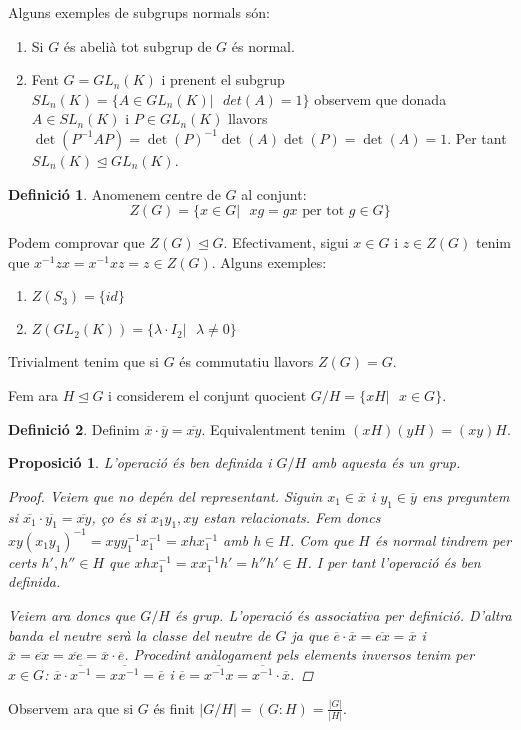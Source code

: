\documentclass[a4paper,11pt]{report}
\newcommand{\inv}[1]{#1^{-1}}
\renewcommand{\bar}{\overline}
\theoremstyle{theorem}
\newtheorem{proposicio}{\normalfont \sffamily\bfseries Proposició}[section]
\theoremstyle{definition}
\newtheorem{definicio}{\normalfont\sffamily\bfseries Definició}[section]
\begin{document}
Alguns exemples de subgrups normals són:
\begin{enumerate}
	\item Si $G$ és abelià tot subgrup de $G$ és normal.
	\item Fent $G=GL_n(K)$ i prenent el subgrup $SL_n(K)=\{A\in GL_n(K)|\text{ }det(A)=1\}$ observem que donada $A\in SL_n(K)$ i $P\in GL_n(K)$ llavors $\det(\inv{P}AP)=\inv{\det(P)}\det(A)\det(P)=\det(A)=1$. Per tant $SL_n(K)\unlhd GL_n(K)$.
\end{enumerate}
\begin{definicio}
Anomenem centre de $G$ al conjunt:
$$Z(G)=\{x\in G|\text{ } xg=gx \text{ per tot }g\in G\}$$
\end{definicio}
Podem comprovar que $Z(G)\unlhd G$. Efectivament, sigui $x\in G$ i $z\in Z(G)$ tenim que $\inv{x}zx=\inv{x}xz=z\in Z(G)$. Alguns exemples:
\begin{enumerate}
	\item $Z(S_3)=\{id\}$
	\item $Z(GL_2(K))=\{\lambda\cdot I_2|\text{ }\lambda\neq 0\}$
\end{enumerate}
Trivialment tenim que si $G$ és commutatiu llavors $Z(G)=G$.

Fem ara $H\unlhd G$ i considerem el conjunt quocient $G/H=\{xH|\text{ }x\in G\}$.
\begin{definicio}
Definim $\bar{x}\cdot\bar{y}=\bar{xy}$. Equivalentment tenim $(xH)(yH)=(xy)H$.
\end{definicio}
\begin{proposicio}
	L'operació és ben definida i $G/H$ amb aquesta és un grup.
	\begin{proof}
		Veiem que no depén del representant. Siguin $x_1\in \bar{x}$ i $y_1\in\bar{y}$ ens preguntem si $\bar{x_1}\cdot\bar{y_1}=\bar{xy}$, ço és si $x_1y_1,xy$ estan relacionats. Fem doncs $xy\inv{(x_1y_1)}=xy\inv{y_1}\inv{x_1}=xh\inv{x_1}$ amb $h\in H$. Com que $H$ és normal tindrem per certs $h',h''\in H$ que $xh\inv{x_1}=x\inv{x_1}h'=h''h'\in H$. I per tant l'operació és ben definida.
		
		Veiem ara doncs que $G/H$ és grup.
		L'operació és associativa per definició. D'altra banda el neutre serà la classe del neutre de $G$ ja que $\bar{e}\cdot\bar{x}=\bar{ex}=\bar{x}$ i $ \bar{x}=\bar{ex}=\bar{xe}=\bar{x}\cdot\bar{e}$. Procedint anàlogament pels elements inversos tenim per $x\in G$: $\bar{x}\cdot\bar{\inv{x}}=\overline{x\inv{x}}=\overline{e}$ i $\bar{e}=\overline{\inv{x}x}=\bar{\inv{x}}\cdot\bar{x}$.
	\end{proof}
\end{proposicio}
Observem ara que si $G$ és finit $|G/H|=(G:H)=\frac{|G|}{|H|}$.
\end{document}
